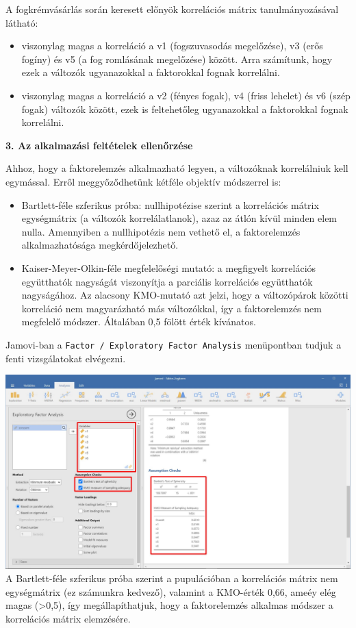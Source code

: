 \documentclass[
  letterpaper,
]{krantz}
\providecommand{\tightlist}{%
  \setlength{\itemsep}{0pt}\setlength{\parskip}{0pt}}\usepackage{longtable,booktabs,array}
\begin{document}
A fogkrémvásárlás során keresett előnyök korrelációs mátrix
tanulmányozásával látható:

\begin{itemize}
\tightlist
\item
  viszonylag magas a korreláció a v1 (fogszuvasodás megelőzése), v3
  (erős fogíny) és v5 (a fog romlásának megelőzése) között. Arra
  számítunk, hogy ezek a változók ugyanazokkal a faktorokkal fognak
  korrelálni.
\item
  viszonylag magas a korreláció a v2 (fényes fogak), v4 (friss lehelet)
  és v6 (szép fogak) változók között, ezek is feltehetőleg ugyanazokkal
  a faktorokkal fognak korrelálni.
\end{itemize}

\textbf{3. Az alkalmazási feltételek ellenőrzése}

Ahhoz, hogy a faktorelemzés alkalmazható legyen, a változóknak
korrelálniuk kell egymással. Erről meggyőződhetünk kétféle objektív
módszerrel is:

\begin{itemize}
\tightlist
\item
  Bartlett-féle szferikus próba: nullhipotézise szerint a korrelációs
  mátrix egységmátrix (a változók korrelálatlanok), azaz az átlón kívül
  minden elem nulla. Amennyiben a nullhipotézis nem vethető el, a
  faktorelemzés alkalmazhatósága megkérdőjelezhető.
\item
  Kaiser-Meyer-Olkin-féle megfelelőségi mutató: a megfigyelt korrelációs
  együtthatók nagyságát viszonyítja a parciális korrelációs együtthatók
  nagyságához. Az alacsony KMO-mutató azt jelzi, hogy a változópárok
  közötti korreláció nem magyarázható más változókkal, így a
  faktorelemzés nem megfelelő módszer. Általában 0,5 fölött érték
  kívánatos.
\end{itemize}

Jamovi-ban a \texttt{Factor\ /\ Exploratory\ Factor\ Analysis}
menüpontban tudjuk a fenti vizsgálatokat elvégezni.

\includegraphics{./images/efa_fogkrem_02.jpg} A Bartlett-féle szferikus
próba szerint a pupulációban a korrelációs mátrix nem egységmátrix (ez
számunkra kedvező), valamint a KMO-érték 0,66, ameéy elég magas
(\textgreater0,5), így megállapíthatjuk, hogy a faktorelemzés alkalmas
módszer a korrelációs mátrix elemzésére.
\end{document}
